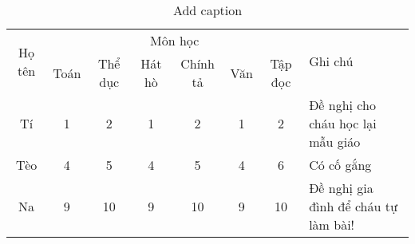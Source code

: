 \begin{table}[h]
  \centering
  \caption{Add caption}
    \begin{tabular}{|c|cccccc|l|}
    \hline
    \multirow{2}[4]{*}{Họ tên} & \multicolumn{6}{c|}{Môn học}  & \multirow{2}[4]{*}{Ghi chú} \\
\cline{2-7}          & Toán  & Thể dục & Hát hò & Chính tả & Văn   & Tập đọc &  \\
    \hline
    \hline
    Tí    & 1     & 2     & 1     & 2     & 1     & 2     & Đề nghị cho cháu học lại mẫu giáo\\
    Tèo   & 4     & 5     & 4     & 5     & 4     & 6     & Có cố gắng \\
    Na    & 9     & 10    & 9     & 10    & 9     & 10    & Đề nghị gia đình để cháu tự làm bài! \\
    \hline
    \end{tabular}%
  \label{tab:addlabel}%
\end{table}%
